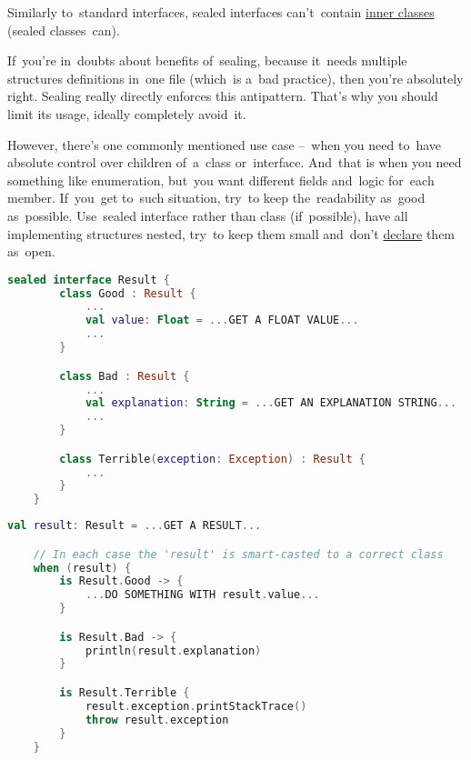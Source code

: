 \warning Similarly to~standard interfaces, sealed interfaces can't~contain \hyperref[kotlininnerclass]{inner classes} (sealed classes~can).

If~you're in~doubts about benefits of~sealing, because it~needs multiple structures definitions in~one file (which~is a~bad practice), then you're absolutely right.
Sealing really directly enforces this antipattern.
That's why you should limit its usage, ideally completely avoid~it.

However, there's one commonly mentioned use case --~when you need to~have absolute control over children of~a~class or~interface.
And~that is when you need something like enumeration, but~you want different fields and~logic for~each member.
If~you~get to~such situation, try~to keep the~readability as~good as~possible.
Use~sealed interface rather than class (if~possible), have all implementing structures nested, try~to keep them small and~don't \hyperref[declarationdefinition]{declare} them as~open.
\newpage

\example
\begin{lstlisting}[language=Kotlin, title={Sealed interface representing a~result}]
    sealed interface Result {
        class Good : Result {
            ...
            val value: Float = ...GET A FLOAT VALUE...
            ...
        }

        class Bad : Result {
            ...
            val explanation: String = ...GET AN EXPLANATION STRING...
            ...
        }

        class Terrible(exception: Exception) : Result {
            ...
        }
    }
\end{lstlisting}
\begin{lstlisting}[language=Kotlin, title={Usage}]
    val result: Result = ...GET A RESULT...

    // In each case the 'result' is smart-casted to a correct class
    when (result) {
        is Result.Good -> {
            ...DO SOMETHING WITH result.value...
        }

        is Result.Bad -> {
            println(result.explanation)
        }

        is Result.Terrible {
            result.exception.printStackTrace()
            throw result.exception
        }
    }
\end{lstlisting}

